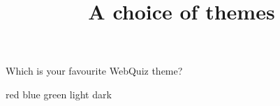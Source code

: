 \documentclass[theme=dark]{webquiz}
\title{A choice of themes}
\begin{document}
  \begin{question}     %
     Which is your favourite WebQuiz theme?
     \begin{choice}[multiple]
       \correct   red
       \incorrect blue
       \incorrect green
       \incorrect light
       \incorrect  dark
     \end{choice}
  \end{question}
\end{document}
